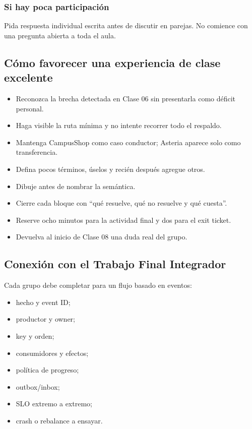 \documentclass[variant=docente,cover=institutional,mode=screen]{ua-engineering-v6-article}
\begin{document}
\subsubsection*{Si hay poca participación}
Pida respuesta individual escrita antes de discutir en parejas. No comience con una pregunta abierta a toda el aula.

\subsection{Cómo favorecer una experiencia de clase excelente}

\begin{itemize}
\item Reconozca la brecha detectada en Clase 06 sin presentarla como déficit personal.
\item Haga visible la ruta mínima y no intente recorrer todo el respaldo.
\item Mantenga CampusShop como caso conductor; Asteria aparece solo como transferencia.
\item Defina pocos términos, úselos y recién después agregue otros.
\item Dibuje antes de nombrar la semántica.
\item Cierre cada bloque con ``qué resuelve, qué no resuelve y qué cuesta''.
\item Reserve ocho minutos para la actividad final y dos para el exit ticket.
\item Devuelva al inicio de Clase 08 una duda real del grupo.
\end{itemize}

\subsection{Conexión con el Trabajo Final Integrador}

Cada grupo debe completar para un flujo basado en eventos:
\begin{itemize}
\item hecho y event ID;
\item productor y owner;
\item key y orden;
\item consumidores y efectos;
\item política de progreso;
\item outbox/inbox;
\item SLO extremo a extremo;
\item crash o rebalance a ensayar.
\end{itemize}
\end{document}
